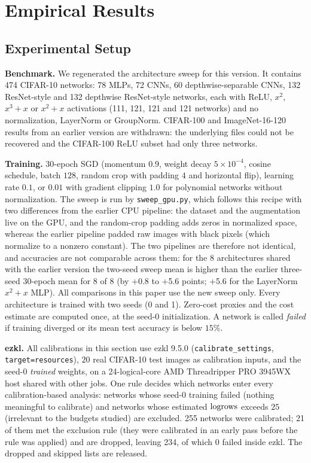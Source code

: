 \section{Empirical Results}
\label{sec:results}

\subsection{Experimental Setup}
\label{sec:setup}

\textbf{Benchmark.}  We regenerated the architecture sweep for this version.  It contains 474 CIFAR-10 networks:
78 MLPs, 72 CNNs, 60 depthwise-separable CNNs, 132 ResNet-style and 132 depthwise ResNet-style networks,
each with ReLU, $x^2$, $x^3{+}x$ or $x^2{+}x$ activations (111, 121, 121 and 121 networks) and no normalization, LayerNorm or GroupNorm.
CIFAR-100 and ImageNet-16-120 results from an earlier version are withdrawn: the underlying files could not be recovered
and the CIFAR-100 ReLU subset had only three networks.

\textbf{Training.}  30-epoch SGD (momentum $0.9$, weight decay $5{\times}10^{-4}$, cosine schedule, batch $128$, random crop with padding $4$
and horizontal flip), learning rate $0.1$, or $0.01$ with gradient clipping $1.0$ for polynomial networks without normalization.  The sweep is
run by \texttt{sweep\_gpu.py}, which follows this recipe with two differences from the earlier CPU pipeline: the dataset and the augmentation live on the GPU, and the random-crop padding
adds zeros in normalized space, whereas the earlier pipeline padded raw images with black pixels (which normalize to a nonzero constant).  The two pipelines are therefore not identical, and
accuracies are not comparable across them: for the 8 architectures shared with the earlier version the two-seed sweep mean is higher than the earlier three-seed 30-epoch mean for
8 of 8 (by +0.8 to +5.6 points; +5.6 for the LayerNorm $x^2{+}x$ MLP).  All comparisons in this paper use the new sweep only.  Every architecture is trained with two seeds (0 and 1).  Zero-cost proxies and the cost estimate are computed
once, at the seed-0 initialization.  A network is called \emph{failed} if training diverged or its mean test accuracy is below $15\%$.

\textbf{ezkl.}  All calibrations in this section use ezkl 9.5.0 (\texttt{calibrate\_settings}, \texttt{target=resources}), $20$ real CIFAR-10 test images as calibration
inputs, and the seed-0 \emph{trained} weights, on a 24-logical-core AMD Threadripper PRO 3945WX host shared with other jobs.  One rule decides which networks enter every calibration-based analysis: networks whose seed-0 training failed (nothing meaningful to calibrate)
and networks whose estimated $\mathrm{logrows}$ exceeds $25$ (irrelevant to the budgets studied) are excluded.  255 networks were calibrated; 21 of them met the exclusion rule (they were calibrated in an early pass
before the rule was applied) and are dropped, leaving 234, of which 0 failed inside ezkl.  The dropped and skipped lists are released.

